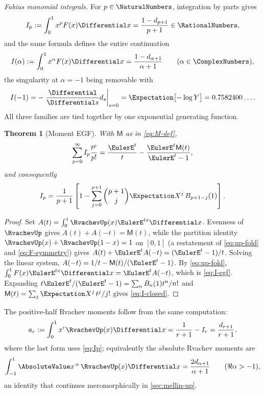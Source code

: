\documentclass[11pt,oneside]{article}
\numberwithin{equation}{section}
\newtheorem{theorem}{Theorem}[section]
\theoremstyle{definition}
\theoremstyle{remark}
\newcommand{\MM}{\mathsf M}
\begin{document}
\emph{Fabius monomial integrals.}  For $p\in\NaturalNumbers$, integration by parts
gives
\begin{equation}
 I_p:=\int_0^1x^pF(x)\Differential x
 =\frac{1-d_{p+1}}{p+1}\in\RationalNumbers,
 \label{eq:Ip}
\end{equation}
and the same formula defines the entire continuation
\begin{equation}
 I(\alpha):=\int_0^1x^\alpha F(x)\Differential x
 =\frac{1-d_{\alpha+1}}{\alpha+1}
 \qquad(\alpha\in\ComplexNumbers),
 \label{eq:Ialpha}
\end{equation}
the singularity at $\alpha=-1$ being removable with
\begin{equation}
 I(-1)=-\left.\frac{\Differential}{\Differential s}d_s\right|_{s=0}
 =\Expectation\bigl[-\log Y\bigr]
 =0.7582400\ldots.
 \label{eq:Iminus1}
\end{equation}
All three families are tied together by one exponential generating
function.

\begin{theorem}[Moment EGF]
\label{thm:moment-egf}
With $\MM$ as in \eqref{eq:M-def},
\begin{equation}
 \sum_{p=0}^{\infty}I_p\frac{t^p}{p!}
 =\frac{\EulerE^{t}}{t}-\frac{\EulerE^{t}\MM(t)}{\EulerE^{t}-1},
 \label{eq:I-egf}
\end{equation}
and consequently
\begin{equation}
 I_p=\frac1{p+1}\left[
 1-\sum_{j=0}^{p+1}\binom{p+1}{j}\Expectation X^{j}\,B_{p+1-j}(1)
 \right].
 \label{eq:I-closed}
\end{equation}
\end{theorem}

\begin{proof}
Set $A(t)=\int_0^1\RvachevUp(x)\EulerE^{tx}\Differential x$.  Evenness of $\RvachevUp$ gives
$A(t)+A(-t)=\MM(t)$, while the partition identity
$\RvachevUp(x)+\RvachevUp(1-x)=1$ on $[0,1]$ (a restatement of
\eqref{eq:up-fold} and \eqref{eq:F-symmetry}) gives
$A(t)+\EulerE^{t}A(-t)=(\EulerE^{t}-1)/t$.  Solving the linear system,
$A(-t)=1/t-\MM(t)/(\EulerE^{t}-1)$.  By \eqref{eq:up-fold},
$\int_0^1F(x)\EulerE^{tx}\Differential x=\EulerE^{t}A(-t)$, which is \eqref{eq:I-egf}.
Expanding $t\EulerE^{t}/(\EulerE^{t}-1)=\sum_nB_n(1)t^n/n!$ and
$\MM(t)=\sum_j\Expectation X^j\,t^j/j!$ gives \eqref{eq:I-closed}.
\end{proof}

The positive-half Rvachev moments follow from the same computation:
\begin{equation}
 a_r:=\int_0^1x^r\RvachevUp(x)\Differential x
 =\frac1{r+1}-I_r
 =\frac{d_{r+1}}{r+1},
 \label{eq:a-r}
\end{equation}
where the last form uses \eqref{eq:Ip}; equivalently the absolute
Rvachev moments are
\begin{equation}
 \int_{-1}^{1}\AbsoluteValue x^{\,\alpha}\,\RvachevUp(x)\Differential x
 =\frac{2d_{\alpha+1}}{\alpha+1}
 \qquad(\Re\alpha>-1),
 \label{eq:absolute-continuous}
\end{equation}
an identity that continues meromorphically in \cref{sec:mellin-up}.
\end{document}
